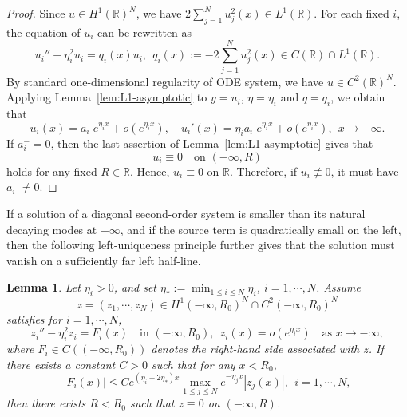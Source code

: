 \documentclass[11pt]{article}
\numberwithin{equation}{section}
\newtheorem{lemma}[theorem]{Lemma}
\theoremstyle{definition}
\begin{document}
\begin{proof}
Since \(u\in H^1(\mathbb R)^N\), we have
$2\sum_{j=1}^N u_j^2(x)\in L^1(\mathbb R)$.
For each fixed \(i\), the equation of \(u_i\) can be rewritten as
\[
u_i''-\eta_i^2u_i=q_i(x)u_i,
\ \
q_i(x):=-2\sum_{j=1}^N u_j^2(x)\in C(\mathbb R)\cap L^1(\mathbb R).
\]
By standard one-dimensional regularity of ODE system, we have
\(u\in C^2(\mathbb R)^N\). Applying Lemma~\ref{lem:L1-asymptotic} to \(y=u_i\),
\(\eta=\eta_i\) and \(q=q_i\), we obtain that
\[
u_i(x)=a_i^- e^{\eta_i x}+o(e^{\eta_i x}),\quad
u_i'(x)=\eta_i a_i^- e^{\eta_i x}+o(e^{\eta_i x}),\ \  x\to-\infty.
\]
If \(a_i^-=0\), then the last assertion of
Lemma~\ref{lem:L1-asymptotic} gives that
\[
u_i\equiv0
\quad\text{on }(-\infty,R)
\]
holds
for any fixed \(R\in\mathbb R\). Hence, \(u_i\equiv0\) on
\(\mathbb R\). Therefore, if \(u_i\not\equiv0\), it must have
$a_i^-\neq0$.
\end{proof}







If a
solution of a diagonal second-order system is smaller than its natural
decaying modes at \(-\infty\), and if the source term is quadratically
small on the left, then the following left-uniqueness principle further gives that the solution must vanish on a sufficiently far
left half-line.



\begin{lemma}
\label{lem:zero-left-principle}
Let \(\eta_i>0\), and
set $\eta_*:=\min_{1\le i\le N}\eta_i$,  \(i=1,\cdots,N\).
Assume
\[
z=(z_1,\cdots,z_N)\in H^1(-\infty,R_0)^N
\cap C^2(-\infty,R_0)^N
\]
satisfies  for \(i=1,\cdots,N\),
\[
z_i''-\eta_i^2z_i=F_i(x)
\quad\text{in }(-\infty,R_0),
\ \
z_i(x)=o(e^{\eta_i x})\quad\text{as }x\to-\infty,
\]
where \(F_i\in C((-\infty,R_0))\) denotes the right-hand side associated
with  \(z\). If there exists a constant \(C>0\) such that for  any \(x<R_0\),
\begin{equation}\label{Fibound}
|F_i(x)|
\le
C e^{(\eta_i+2\eta_*)x}
\max_{1\le j\le N} e^{-\eta_jx}|z_j(x)|,
\ \  i=1,\cdots,N,
\end{equation}
then there exists $R<R_0$ such that \(z\equiv0\) on  $(-\infty,R)$.
\end{lemma}
\end{document}
